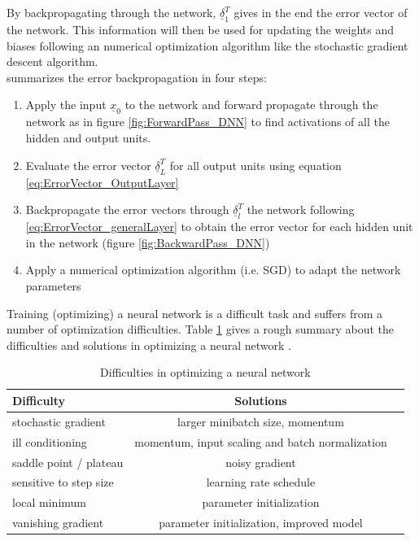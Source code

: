 \documentclass[12pt,DIV14,BCOR12mm,a4paper,footexclude,headinclude,halfparskip-,twoside,openright,openany,cleardoubleempty,idxtotoc,bibtotoc]{scrreprt} %
\numberwithin{equation}{chapter}
\begin{document}
By backpropagating through the network, $\underline{\delta}_{1}^{T}$ gives in the end the error vector of the network. This information will then be used for updating the weights and biases following an numerical optimization algorithm like the stochastic gradient descent algorithm.\\
\cite{Bishop} summarizes the error backpropagation in four steps:
\begin{enumerate}
	\item Apply the input $\underline{x}_{0}$ to the network and forward propagate through the network as in figure \ref{fig:ForwardPass_DNN} to find activations of all the hidden and output units.
	\item Evaluate the error vector $\underline{\delta}_{L}^{T}$ for all output units using equation \ref{eq:ErrorVector_OutputLayer}
	\item Backpropagate the error vectors through $\underline{\delta}_{l}^{T}$ the network following \ref{eq:ErrorVector_generalLayer} to obtain the error vector for each hidden unit in the network (figure \ref{fig:BackwardPass_DNN})
	\item Apply a numerical optimization algorithm (i.e. SGD) to adapt the network parameters
\end{enumerate}
Training (optimizing) a neural network is a difficult task and suffers from a number of optimization difficulties. Table \ref{tab:Difficulties} gives a rough summary about the difficulties and solutions in optimizing a neural network \cite{LectureNotes_DeepLearning}.\\
\begin{table}
    \centering
    \caption{Difficulties in optimizing a neural network}
    \label{tab:Difficulties}
    \begin{tabular}{lcc}
        \toprule
        Difficulty & Solutions\\
        \midrule
        stochastic gradient & larger minibatch size, momentum\\
        ill conditioning & momentum, input scaling and batch normalization\\
        saddle point / plateau & noisy gradient\\
        sensitive to step size & learning rate schedule\\
        local minimum & parameter initialization\\
        vanishing gradient & parameter initialization, improved model\\
        \bottomrule
    \end{tabular}
\end{table}
\end{document}
